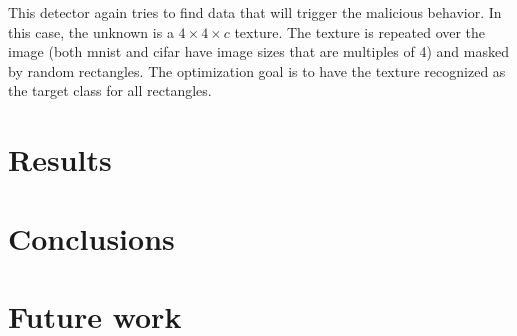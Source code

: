 \documentclass[letterpaper, 10 pt, conference]{ieeeconf}  %
\begin{document}
This detector again tries to find data that will trigger the malicious
behavior.  In this case, the unknown is a $4\times 4\times c$ texture.  The
texture is repeated over the image (both mnist and cifar have image
sizes that are multiples of 4) and masked by random rectangles.  The
optimization goal is to have the texture recognized as the target
class for all rectangles.

\section{Results}


\section{Conclusions}

\section{Future work}
\end{document}
